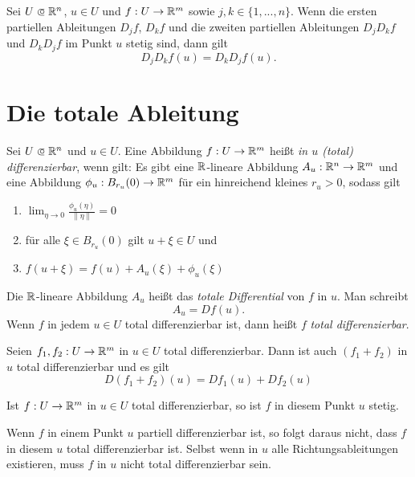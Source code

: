\documentclass{cheat-sheet}
\begin{document}
\begin{samepage}

\begin{satz}
Sei $U \opn \R^n$, $u \in U$ und $f : U \to \mathbb{R}^m$ sowie $j, k \in \{ 1, ..., n \}$. Wenn die ersten partiellen Ableitungen $D_j f$, $D_k f$ und die zweiten partiellen Ableitungen $D_j D_k f$ und $D_k D_j f$ im Punkt $u$ stetig sind, dann gilt
\[ D_j D_k f(u) = D_k D_j f(u). \]
\end{satz}



\section{Die totale Ableitung}

\end{samepage}

\begin{defn}
Sei $U \opn \R^n$ und $u \in U$. Eine Abbildung $f : U \to \mathbb{R}^m$ heißt \emph{in $u$ (total) differenzierbar}, wenn gilt: Es gibt eine $\mathbb{R}$-lineare Abbildung $A_u : \mathbb{R}^n \to \mathbb{R}^m$ und eine Abbildung $\phi_u : B_{r_u}(0) \to \mathbb{R}^m$ für ein hinreichend kleines $r_u > 0$, sodass gilt
\begin{enumerate}
  \item $\lim_{\eta \to 0} \tfrac{ \phi_u(\eta) }{ \| \eta \| } = 0$
  \item für alle $\xi \in B_{r_u}(0)$ gilt $u + \xi \in U$ und
  \item $f(u + \xi) = f(u) + A_u(\xi) + \phi_u(\xi)$
\end{enumerate}
Die $\mathbb{R}$-lineare Abbildung $A_u$ heißt das \emph{totale Differential} von $f$ in $u$. Man schreibt
\[ A_u = D f(u). \]
Wenn $f$ in jedem $u \in U$ total differenzierbar ist, dann heißt $f$ \emph{total differenzierbar}.
\end{defn}

\begin{bem}
Seien $f_1, f_2 : U \to \mathbb{R}^m$ in $u \in U$ total differenzierbar. Dann ist auch $(f_1 + f_2)$ in $u$ total differenzierbar und es gilt
\[ D (f_1 + f_2)(u) = D f_1(u) + D f_2(u) \]
\end{bem}

\begin{satz}
Ist $f : U \to \mathbb{R}^m$ in $u \in U$ total differenzierbar, so ist $f$ in diesem Punkt $u$ stetig.
\end{satz}

\begin{acht}
Wenn $f$ in einem Punkt $u$ partiell differenzierbar ist, so folgt daraus nicht, dass $f$ in diesem $u$ total differenzierbar ist. Selbst wenn in $u$ alle Richtungsableitungen existieren, muss $f$ in $u$ nicht total differenzierbar sein.
\end{acht}
\end{document}

